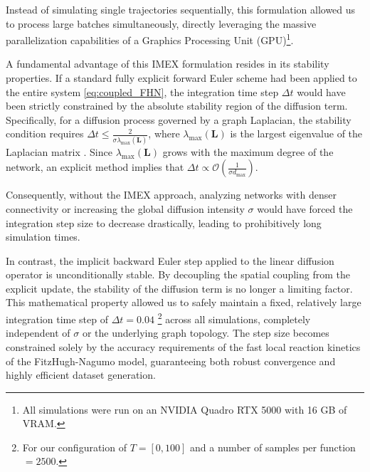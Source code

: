 Instead of simulating single trajectories sequentially, this formulation allowed us to process large batches simultaneously, directly leveraging the massive parallelization capabilities of a Graphics Processing Unit (GPU)\footnote{All simulations were run on an NVIDIA Quadro RTX 5000 with 16 GB of VRAM.}.

A fundamental advantage of this IMEX formulation resides in its stability properties. If a standard fully explicit forward Euler scheme had been applied to the entire system \eqref{eq:coupled_FHN}, the integration time step $\Delta t$ would have been strictly constrained by the absolute stability region of the diffusion term. Specifically, for a diffusion process governed by a graph Laplacian, the stability condition requires $\Delta t \le \frac{2}{\sigma \lambda_{\text{max}}(\mathbf{L})}$, where $\lambda_{\text{max}}(\mathbf{L})$ is the largest eigenvalue of the Laplacian matrix  \cite{obrien1950study}. Since $\lambda_{\text{max}}(\mathbf{L})$ grows with the maximum degree of the network, an explicit method implies that $\Delta t \propto \mathcal{O}\left( \frac{1}{\sigma d_{\text{max}}} \right)$.

Consequently, without the IMEX approach, analyzing networks with denser connectivity or increasing the global diffusion intensity $\sigma$ would have forced the integration step size to decrease drastically, leading to prohibitively long simulation times. 

In contrast, the implicit backward Euler step applied to the linear diffusion operator is unconditionally stable. By decoupling the spatial coupling from the explicit update, the stability of the diffusion term is no longer a limiting factor. This mathematical property allowed us to safely maintain a fixed, relatively large integration time step of $\Delta t = 0.04$ \footnote{For our configuration of $T=[0,100]$ and a number of samples per function $= 2500$.} across all simulations, completely independent of $\sigma$ or the underlying graph topology. The step size becomes constrained solely by the accuracy requirements of the fast local reaction kinetics of the FitzHugh-Nagumo model, guaranteeing both robust convergence and highly efficient dataset generation.





